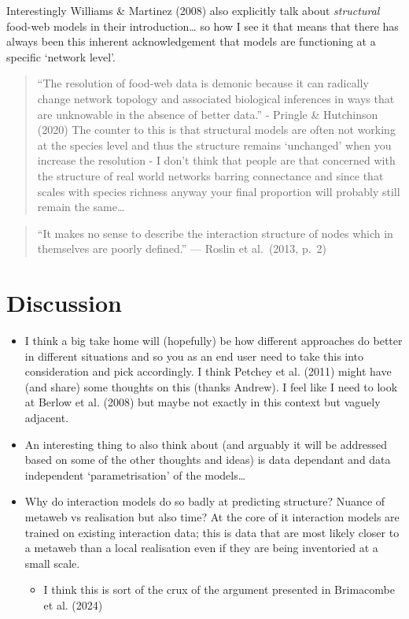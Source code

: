 \documentclass[
]{article}
\providecommand{\tightlist}{%
  \setlength{\itemsep}{0pt}\setlength{\parskip}{0pt}}\usepackage{longtable,booktabs,array}
\begin{document}
Interestingly Williams \& Martinez (2008) also explicitly talk about
\emph{structural} food-web models in their introduction\ldots{} so how I
see it that means that there has always been this inherent
acknowledgement that models are functioning at a specific `network
level'.

\begin{quote}
``The resolution of food-web data is demonic because it can radically
change network topology and associated biological inferences in ways
that are unknowable in the absence of better data.'' - Pringle \&
Hutchinson (2020) The counter to this is that structural models are
often not working at the species level and thus the structure remains
`unchanged' when you increase the resolution - I don't think that people
are that concerned with the structure of real world networks barring
connectance and since that scales with species richness anyway your
final proportion will probably still remain the same\ldots{}
\end{quote}

\begin{quote}
``It makes no sense to describe the interaction structure of nodes which
in themselves are poorly defined.'' --- Roslin et al.~(2013, p.~2)
\end{quote}

\section{Discussion}\label{discussion}

\begin{itemize}
\item
  I think a big take home will (hopefully) be how different approaches
  do better in different situations and so you as an end user need to
  take this into consideration and pick accordingly. I think Petchey et
  al. (2011) might have (and share) some thoughts on this (thanks
  Andrew). I feel like I need to look at Berlow et al. (2008) but maybe
  not exactly in this context but vaguely adjacent.
\item
  An interesting thing to also think about (and arguably it will be
  addressed based on some of the other thoughts and ideas) is data
  dependant and data independent `parametrisation' of the models\ldots{}
\item
  Why do interaction models do so badly at predicting structure? Nuance
  of metaweb vs realisation but also time? At the core of it interaction
  models are trained on existing interaction data; this is data that are
  most likely closer to a metaweb than a local realisation even if they
  are being inventoried at a small scale.

  \begin{itemize}
  \tightlist
  \item
    I think this is sort of the crux of the argument presented in
    Brimacombe et al. (2024)
  \end{itemize}
\end{itemize}
\end{document}

